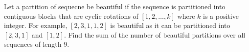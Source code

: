Let a partition of sequecne be beautiful if the sequence is partitioned into contiguous blocks that are cyclic rotations of $[1,2,\dots,k]$ where $k$ is a positive integer. For example, $[2,3,1,1,2]$ is beautiful as it can be partitioned into $[2,3,1]$ and $[1,2]$. Find the sum of the number of beautiful partitions over all sequences of length $9$.
